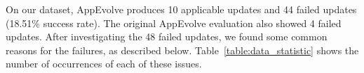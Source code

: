On our dataset, AppEvolve produces 10 applicable updates and 44 failed
updates (18.51\% success rate). The original AppEvolve evaluation also showed 4 failed updates.
After investigating the 48 failed updates, we found some common reasons for
the failures, as described below. Table~\ref{table:data_statistic} shows
the number of occurrences of each of these issues.


